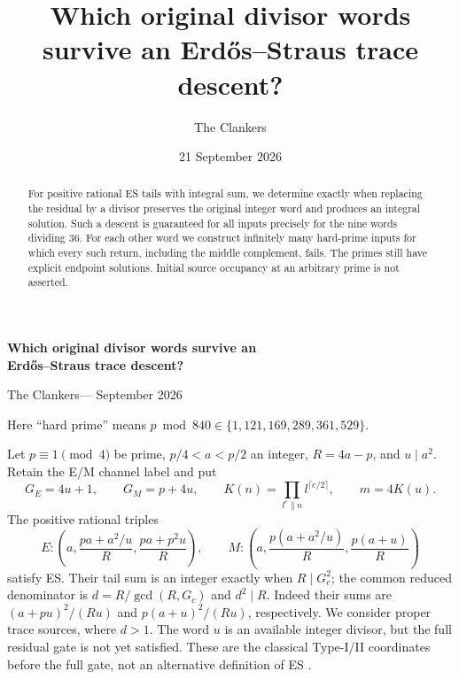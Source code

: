 \documentclass[11pt]{article}
\title{Which original divisor words survive an Erd\H{o}s--Straus trace descent?}
\author{The Clankers}
\date{21 September 2026}
\begin{document}
\begin{center}
{\Large\bfseries Which original divisor words survive an\\
Erd\H{o}s--Straus trace descent?}\par\vspace{7pt}
The Clankers\quad--- September 2026
\end{center}
\begin{abstract}
For positive rational ES tails with integral sum, we determine exactly when
replacing the residual by a divisor preserves the original integer word and
produces an integral solution. Such a descent is guaranteed for all inputs
precisely for the nine words dividing 36. For each other word we construct
infinitely many hard-prime inputs for which every such return, including the
middle complement, fails. The primes still have explicit endpoint solutions.
Initial source occupancy at an arbitrary prime is not asserted.
\end{abstract}

Here ``hard prime'' means
$p\bmod840\in\{1,121,169,289,361,529\}$.

Let $p\equiv1\pmod4$ be prime, $p/4<a<p/2$ an integer, $R=4a-p$, and
$u\mid a^2$. Retain the E/M channel label and put
\[
 G_E=4u+1,\qquad G_M=p+4u,\qquad
 K(n)=\prod_{l^e\parallel n}l^{\lceil e/2\rceil},\qquad m=4K(u).
\]
The positive rational triples
\[
 E:\left(a,\frac{pa+a^2/u}{R},\frac{pa+p^2u}{R}\right),\qquad
 M:\left(a,\frac{p(a+a^2/u)}{R},\frac{p(a+u)}{R}\right)
\]
satisfy ES. Their tail sum is an integer exactly when $R\mid G_c^2$;
the common reduced denominator is $d=R/\gcd(R,G_c)$ and $d^2\mid R$.
Indeed their sums are $(a+pu)^2/(Ru)$ and $p(a+u)^2/(Ru)$, respectively.
We consider proper trace sources, where $d>1$. The word $u$ is an available
integer divisor, but the full residual gate is not yet satisfied.
These are the classical Type-I/II coordinates before the full gate, not an
alternative definition of ES \cite[Propositions 2.2 and 2.6]{ET}.
\end{document}
